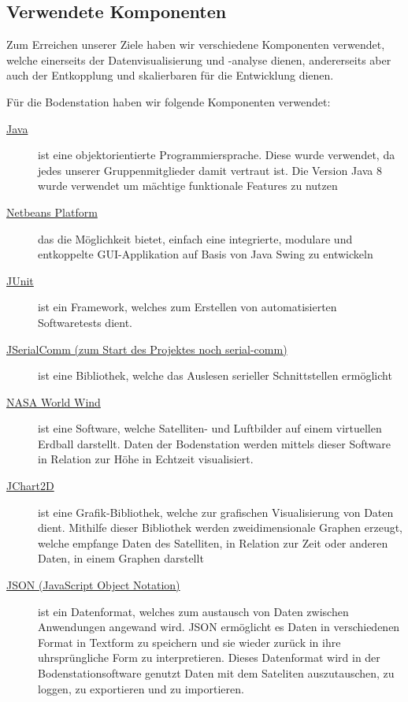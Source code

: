 \subsection{Verwendete Komponenten}
Zum Erreichen unserer Ziele haben wir verschiedene Komponenten verwendet, welche einerseits der Datenvisualisierung und -analyse dienen, andererseits aber auch der Entkopplung und skalierbaren für die Entwicklung dienen.

Für die Bodenstation haben wir folgende Komponenten verwendet:
\begin{description}
	\item[\href{http://www.oracle.com/technetwork/java/javase/downloads/jdk8-downloads-2133151.html}{Java}] ist eine objektorientierte Programmiersprache. Diese wurde verwendet, da jedes unserer Gruppenmitglieder damit vertraut ist. Die Version Java 8 wurde verwendet um mächtige funktionale Features zu nutzen
	\item[\href{https://netbeans.org/features/platform/}{Netbeans Platform}] das die Möglichkeit bietet, einfach eine integrierte, modulare und entkoppelte GUI-Applikation auf Basis von Java Swing zu entwickeln
	\item[\href{http://junit.org/}{JUnit}] ist ein Framework, welches zum Erstellen von automatisierten Softwaretests dient.
	\item[\href{http://fazecast.github.io/jSerialComm/}{JSerialComm (zum Start des Projektes noch serial-comm)}] ist eine Bibliothek, welche das Auslesen serieller Schnittstellen ermöglicht 
	\item[\href{http://worldwind.arc.nasa.gov/java/}{NASA World Wind}] ist eine Software, welche Satelliten- und Luftbilder auf einem virtuellen Erdball darstellt. Daten der Bodenstation werden mittels dieser Software in Relation zur Höhe in Echtzeit visualisiert.
	\item[\href{http://jchart2d.sourceforge.net/}{JChart2D}] ist eine Grafik-Bibliothek, welche zur grafischen Visualisierung von Daten dient. Mithilfe dieser Bibliothek werden zweidimensionale Graphen erzeugt, welche empfange Daten des Satelliten, in Relation zur Zeit oder anderen Daten, in einem Graphen darstellt
	\item[\href{http://www.json.org/}{JSON (JavaScript Object Notation)}] ist ein Datenformat, welches zum austausch von Daten zwischen Anwendungen angewand wird. JSON ermöglicht es Daten in verschiedenen Format in Textform zu speichern und sie wieder zurück in ihre uhrsprüngliche Form zu interpretieren. Dieses Datenformat wird in der Bodenstationsoftware genutzt Daten mit dem Sateliten auszutauschen, zu loggen, zu exportieren und zu importieren.
\end{description}